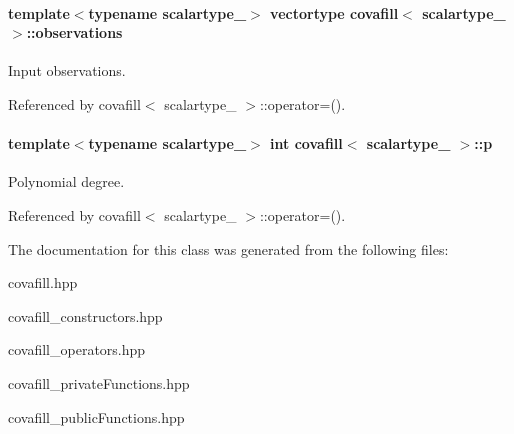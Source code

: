 \hypertarget{classcovafill_a81186c0884235f65e014350579617a74}{}
\paragraph[{observations}]{\setlength{\rightskip}{0pt plus 5cm}template$<$typename scalartype\+\_\+$>$ vectortype {\bf covafill}$<$ scalartype\+\_\+ $>$\+::observations}\label{classcovafill_a81186c0884235f65e014350579617a74}
Input observations. 

Referenced by covafill$<$ scalartype\+\_\+ $>$\+::operator=().

\hypertarget{classcovafill_a6aaea280399bd705581e3c387d1f7750}{}
\paragraph[{p}]{\setlength{\rightskip}{0pt plus 5cm}template$<$typename scalartype\+\_\+$>$ int {\bf covafill}$<$ scalartype\+\_\+ $>$\+::p}\label{classcovafill_a6aaea280399bd705581e3c387d1f7750}
Polynomial degree. 

Referenced by covafill$<$ scalartype\+\_\+ $>$\+::operator=().



The documentation for this class was generated from the following files\+:\begin{DoxyCompactItemize}
\item 
covafill.\+hpp\item 
covafill\+\_\+constructors.\+hpp\item 
covafill\+\_\+operators.\+hpp\item 
covafill\+\_\+private\+Functions.\+hpp\item 
covafill\+\_\+public\+Functions.\+hpp\end{DoxyCompactItemize}
